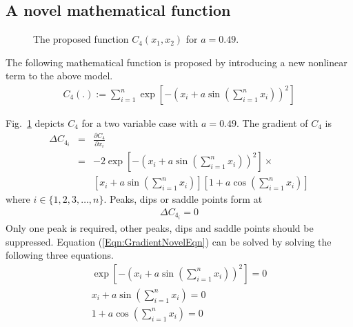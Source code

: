 \documentclass[twocolumn]{svjour3}          %
\begin{document}
\subsection{A novel mathematical function}
\begin{figure}
	\centering
	\caption{The proposed function $C_4(x_1, x_2)$ for $a = 0.49$.}
	\label{Fig:TwoVarNovelFunc}
\end{figure}
The following mathematical function is proposed by introducing a new nonlinear term to the above model.
\begin{eqnarray}
	C_4(.) := \sum_{i=1}^{n}{\exp[-\left(x_i + a\sin\left(\sum_{i=1}^{n} x_i\right)\right)^2]} \label{Eqn:Novelmodel}
\end{eqnarray}
\par
Fig.~\ref{Fig:TwoVarNovelFunc} depicts $C_4$ for a two variable case with $a=0.49$. The gradient of $C_4$ is
\begin{eqnarray}
	\Delta C_{4_i} &=& \frac{\partial C_4}{\partial x_i} \nonumber\\
	&=& -2\exp[-\left(x_i + a\sin\left(\sum_{i=1}^{n} x_i\right)\right)^2] \times \nonumber\\
	&& \left[ x_i + a\sin\left(\sum_{i=1}^{n} x_i\right) \right] \left[1 + a\cos\left(\sum_{i=1}^{n} x_i\right) \right] \label{Eqn:GradientNovelFunc}
\end{eqnarray}
where $i \in \{1, 2, 3, \dots, n\}$. Peaks, dips or saddle points form at 
\begin{eqnarray}
	\Delta C_{4_i}=0 \label{Eqn:GradientNovelEqn}
\end{eqnarray}
Only one peak is required, other peaks, dips and saddle points should be suppressed. Equation (\ref{Eqn:GradientNovelEqn}) can be solved by solving the following three equations.
\begin{eqnarray}
	\exp[-\left(x_i + a\sin\left(\sum_{i=1}^{n} x_i\right)\right)^2]=0 \label{Eqn:GradientNovelEqn1} \\
	x_i + a\sin\left(\sum_{i=1}^{n} x_i\right)=0 \label{Eqn:GradientNovelSol2} \\
	1 + a\cos\left(\sum_{i=1}^{n} x_i\right)=0 \label{Eqn:GradientNovelEqn3}
\end{eqnarray}
\end{document}
